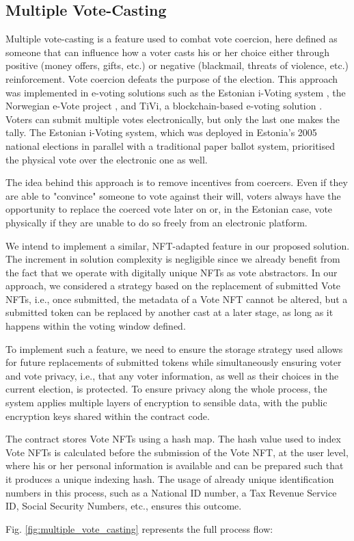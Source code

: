\documentclass[../main.tex]{subfiles}
\begin{document}
\subsection{Multiple Vote-Casting}
\label{multiple_vote_casting}
Multiple vote-casting is a feature used to combat vote coercion, here defined as someone that can influence how a voter casts his or her choice either through positive (money offers, gifts, etc.) or negative (blackmail, threats of violence, etc.) reinforcement. Vote coercion defeats the purpose of the election. This approach was implemented in e-voting solutions such as the Estonian i-Voting system \cite{Madise2006}, the Norwegian e-Vote project \cite{Barrat2012}, and TiVi, a blockchain-based e-voting solution \cite{TiVi2021}. Voters can submit multiple votes electronically, but only the last one makes the tally. The Estonian i-Voting system, which was deployed in Estonia's 2005 national elections in parallel with a traditional paper ballot system, prioritised the physical vote over the electronic one as well.
\par
The idea behind this approach is to remove incentives from coercers. Even if they are able to "convince" someone to vote against their will, voters always have the opportunity to replace the coerced vote later on or, in the Estonian case, vote physically if they are unable to do so freely from an electronic platform.
\par
We intend to implement a similar, NFT-adapted feature in our proposed solution. The increment in solution complexity is negligible since we already benefit from the fact that we operate with digitally unique NFTs as vote abstractors. In our approach, we considered a strategy based on the replacement of submitted Vote NFTs, i.e., once submitted, the metadata of a Vote NFT cannot be altered, but a submitted token can be replaced by another cast at a later stage, as long as it happens within the voting window defined.
\par
To implement such a feature, we need to ensure the storage strategy used allows for future replacements of submitted tokens while simultaneously ensuring voter and vote privacy, i.e., that any voter information, as well as their choices in the current election, is protected. To ensure privacy along the whole process, the system applies multiple layers of encryption to sensible data, with the public encryption keys shared within the contract code.
\par
The contract stores Vote NFTs using a hash map. The hash value used to index Vote NFTs is calculated before the submission of the Vote NFT, at the user level, where his or her personal information is available and can be prepared such that it produces a unique indexing hash. The usage of already unique identification numbers in this process, such as a National ID number, a Tax Revenue Service ID, Social Security Numbers, etc., ensures this outcome.
\par
Fig. \ref{fig:multiple_vote_casting} represents the full process flow:
\end{document}
